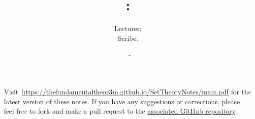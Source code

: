 \documentclass[a4paper, 12pt, openany, oneside]{book}
\title{\vspace{-2em}\COURSENUMBER: \COURSENAME}
\author{Lecturer: \LECTURER \\ Scribe: \SCRIBE}
\date{\UNIVERSITY\ - \TERM}
\begin{document}
\setlength{\abovedisplayskip}{7.5pt}  %
\setlength{\belowdisplayskip}{7.5pt}  %
\setlength{\abovedisplayshortskip}{2pt}
\setlength{\belowdisplayshortskip}{2pt}

\maketitle
\thispagestyle{empty}

\tableofcontents
\thispagestyle{empty}

\newpage

\nocite{*}






% 

% 

\newpage




\printbibliography[prenote=mybibnote]
\thispagestyle{empty}

Visit~\url{https://thefundamentaltheor3m.github.io/SetTheoryNotes/main.pdf} for the latest version of these notes. If you have any suggestions or corrections, please feel free to fork and make a pull request to the \href{https://github.com/thefundamentaltheor3m/SetTheoryNotes}{associated GitHub repository}.
\end{document}
